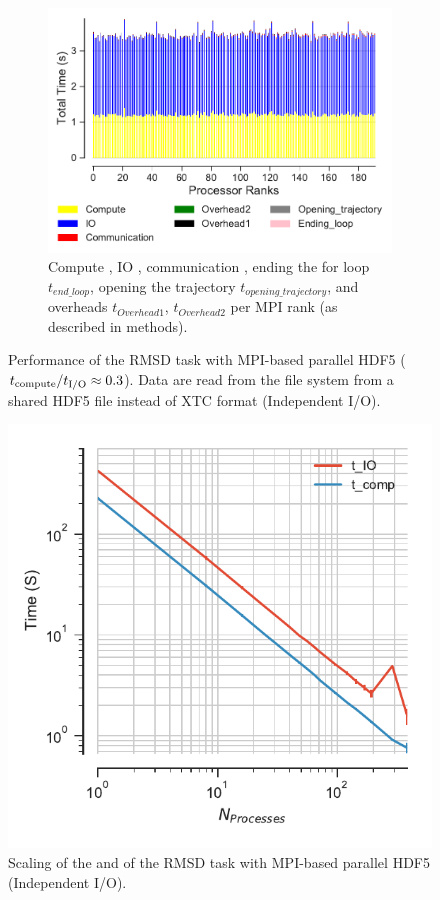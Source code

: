 \begin{figure}[ht!]
\begin{subfigure} {.8\textwidth}
  \includegraphics[width=\linewidth]{figures/hdf5-BarPlot-rank-comparison_192_4.pdf}
  \caption{Compute \tcomp, IO \tIO, communication \tcomm , ending the for loop $t_{end\_loop}$,
  opening the trajectory $t_{opening\_trajectory}$, and overheads $t_{Overhead1}$,  $t_{Overhead2}$ per MPI rank (as described in methods).}
  \label{fig:MPIranks-hdf5}
\end{subfigure}
%
\caption{Performance of the RMSD task with MPI-based parallel HDF5 (${t}_{\text{compute}}/{t}_{\text{I/O}} \approx 0.3$).
Data are read from the file system from a shared HDF5 file instead of XTC format (Independent I/O).}
\label{fig:MPIwithIO-hdf5}
\end{figure}

\begin{figure}[ht!]
\centering
  \includegraphics[width=0.4\linewidth]{figures/hdf5-time_IO_comparison.pdf}
\caption{Scaling of the \tcomp and \tIO of the RMSD task with MPI-based parallel HDF5 (Independent I/O).}
\label{fig:ScalingComputeIO-hdf5}
\end{figure}
